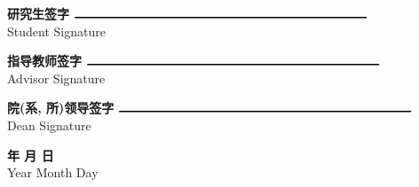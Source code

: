 \begin{titlepage}
\begin{CJK*}{UTF8}{gkai}

\null %
\vfill
\Large    
\flushleft
\setlength{\leftskip}{3cm}

    \textbf{研究生签字} \hspace{1.2cm} $\rule{8.3cm}{0.3mm}$ \\
    \large{Student Signature}
    
\vspace{0.5cm}
    
    \textbf{指导教师签字} \hspace{1.2cm} $\rule{8.3cm}{0.3mm}$ \\
    \large{Advisor Signature}

\vspace{0.5cm}

    \textbf{院(系, 所)领导签字} \hspace{0.1cm} $\rule{8.3cm}{0.3mm}$ \\
    \large{Dean Signature}
    
\flushright

    \textbf{年 \qquad 月 \qquad 日} \\
    \large{Year \quad Month \quad Day} \\

\end{CJK*}

\end{titlepage}